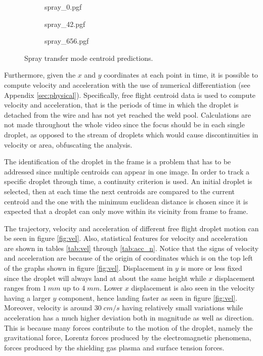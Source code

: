 \begin{figure}
\centering
  \begin{subfigure}[b]{0.45\textwidth}
    {spray_0.pgf}
    \caption{}

  \end{subfigure}
\hfill
  \begin{subfigure}[b]{0.45\textwidth}
    {spray_42.pgf}
    \caption{}
  \end{subfigure}
  \begin{subfigure}[b]{0.45\textwidth}
    {spray_656.pgf}
    \caption{}
  \end{subfigure}
    \caption[Spray transfer mode centroid predictions]{Spray transfer mode centroid predictions.}
    \label{fig:spray_centroids}
\end{figure}

Furthermore, given the $x$ and $y$ coordinates at each point in time, it is possible to compute velocity and acceleration with the use of numerical differentiation (see Appendix \ref{sec:physical}). Specifically, free flight centroid data is used to compute velocity and acceleration, that is the periods of time in which the droplet is detached from the wire and has not yet reached the weld pool. Calculations are not made throughout the whole video since the focus should be in each single droplet, as opposed to the stream of droplets which would cause discontinuities in velocity or area, obfuscating the analysis.

The identification of the droplet in the frame is a problem that has to be addressed since multiple centroids can appear in one image. In order to track a specific droplet through time, a continuity criterion is used. An initial droplet is selected, then at each time the next centroids are compared to the current centroid and the one with the minimum euclidean distance is chosen since it is expected that a droplet can only move within its vicinity from frame to frame.

The trajectory, velocity and acceleration of different free flight droplet motion can be seen in figure \ref{fig:vel}. Also, statistical features for velocity and acceleration are shown in tables \ref{tab:vel} through \ref{tab:acc_n}. Notice that the signs of velocity and acceleration are because of the origin of coordinates which is on the top left of the graphs shown in figure \ref{fig:vel}. Displacement in $y$ is more or less fixed since the droplet will always land at about the same height while $x$ displacement ranges from $1\:mm$ up to $4\;mm$. Lower $x$ displacement is also seen in the velocity having a larger $y$ component, hence landing faster as seen in figure \ref{fig:vel}. Moreover, velocity is around $30\;cm/s$ having relatively small variations while acceleration has a much higher deviation both in magnitude as well as direction. This is because many forces contribute to the motion of the droplet, namely the gravitational force, Lorentz forces produced by the electromagnetic phenomena, forces produced by the shielding gas plasma and surface tension forces.

